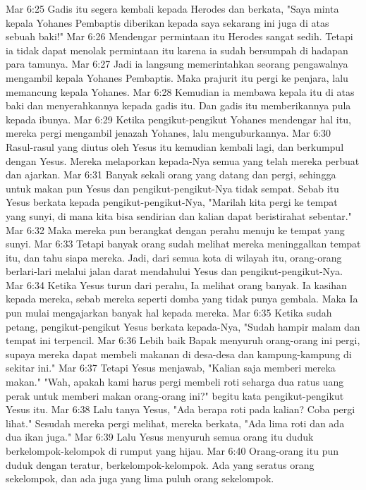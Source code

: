 Mar 6:25  Gadis itu segera kembali kepada Herodes dan berkata, "Saya minta kepala Yohanes Pembaptis diberikan kepada saya sekarang ini juga di atas sebuah baki!"
Mar 6:26  Mendengar permintaan itu Herodes sangat sedih. Tetapi ia tidak dapat menolak permintaan itu karena ia sudah bersumpah di hadapan para tamunya.
Mar 6:27  Jadi ia langsung memerintahkan seorang pengawalnya mengambil kepala Yohanes Pembaptis. Maka prajurit itu pergi ke penjara, lalu memancung kepala Yohanes.
Mar 6:28  Kemudian ia membawa kepala itu di atas baki dan menyerahkannya kepada gadis itu. Dan gadis itu memberikannya pula kepada ibunya.
Mar 6:29  Ketika pengikut-pengikut Yohanes mendengar hal itu, mereka pergi mengambil jenazah Yohanes, lalu menguburkannya.
Mar 6:30  Rasul-rasul yang diutus oleh Yesus itu kemudian kembali lagi, dan berkumpul dengan Yesus. Mereka melaporkan kepada-Nya semua yang telah mereka perbuat dan ajarkan.
Mar 6:31  Banyak sekali orang yang datang dan pergi, sehingga untuk makan pun Yesus dan pengikut-pengikut-Nya tidak sempat. Sebab itu Yesus berkata kepada pengikut-pengikut-Nya, "Marilah kita pergi ke tempat yang sunyi, di mana kita bisa sendirian dan kalian dapat beristirahat sebentar."
Mar 6:32  Maka mereka pun berangkat dengan perahu menuju ke tempat yang sunyi.
Mar 6:33  Tetapi banyak orang sudah melihat mereka meninggalkan tempat itu, dan tahu siapa mereka. Jadi, dari semua kota di wilayah itu, orang-orang berlari-lari melalui jalan darat mendahului Yesus dan pengikut-pengikut-Nya.
Mar 6:34  Ketika Yesus turun dari perahu, Ia melihat orang banyak. Ia kasihan kepada mereka, sebab mereka seperti domba yang tidak punya gembala. Maka Ia pun mulai mengajarkan banyak hal kepada mereka.
Mar 6:35  Ketika sudah petang, pengikut-pengikut Yesus berkata kepada-Nya, "Sudah hampir malam dan tempat ini terpencil.
Mar 6:36  Lebih baik Bapak menyuruh orang-orang ini pergi, supaya mereka dapat membeli makanan di desa-desa dan kampung-kampung di sekitar ini."
Mar 6:37  Tetapi Yesus menjawab, "Kalian saja memberi mereka makan." "Wah, apakah kami harus pergi membeli roti seharga dua ratus uang perak untuk memberi makan orang-orang ini?" begitu kata pengikut-pengikut Yesus itu.
Mar 6:38  Lalu tanya Yesus, "Ada berapa roti pada kalian? Coba pergi lihat." Sesudah mereka pergi melihat, mereka berkata, "Ada lima roti dan ada dua ikan juga."
Mar 6:39  Lalu Yesus menyuruh semua orang itu duduk berkelompok-kelompok di rumput yang hijau.
Mar 6:40  Orang-orang itu pun duduk dengan teratur, berkelompok-kelompok. Ada yang seratus orang sekelompok, dan ada juga yang lima puluh orang sekelompok.
